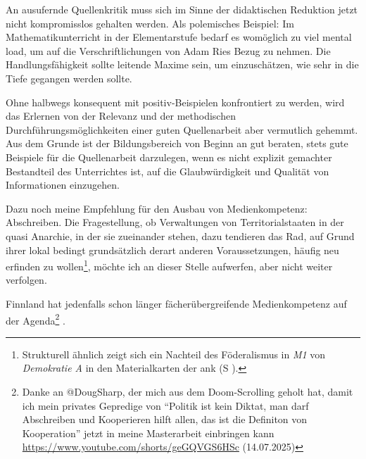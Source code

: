 An ausufernde Quellenkritik muss sich im Sinne der didaktischen Reduktion jetzt nicht kompromisslos gehalten werden.
Als polemisches Beispiel: Im Mathematikunterricht in der Elementarstufe bedarf es womöglich zu viel mental load, um auf die Verschriftlichungen von Adam Ries Bezug zu nehmen. Die Handlungsfähigkeit sollte leitende Maxime sein, um einzuschätzen, wie sehr in die Tiefe gegangen werden sollte. 

Ohne halbwegs konsequent mit positiv-Beispielen konfrontiert zu werden, wird das Erlernen von der Relevanz und der methodischen Durchführungsmöglichkeiten einer guten Quellenarbeit aber vermutlich gehemmt. Aus dem Grunde ist der Bildungsbereich von Beginn an gut beraten, stets gute Beispiele für die Quellenarbeit darzulegen, wenn es nicht explizit gemachter Bestandteil des Unterrichtes ist, auf die Glaubwürdigkeit und Qualität von Informationen einzugehen. 



\bigskip

Dazu noch meine Empfehlung für den Ausbau von Medienkompetenz: Abschreiben. Die Fragestellung, ob Verwaltungen von Territorialstaaten in der quasi Anarchie, in der sie zueinander stehen, dazu tendieren das Rad, auf Grund ihrer lokal bedingt grundsätzlich derart anderen Voraussetzungen,  häufig neu erfinden zu wollen\footnote{
    Strukturell ähnlich zeigt sich ein Nachteil des Föderalismus in \emph{M1} von \emph{Demokratie A} in den Materialkarten der \gls{ank} (\gls{S} \pageref{DEMOKRATIE-A3}).}, 
möchte ich an dieser Stelle aufwerfen, aber nicht weiter verfolgen. 

\noindent Finnland hat jedenfalls schon länger fächerübergreifende Medienkompetenz auf der Agenda\footnote{
    Danke an @DougSharp, der mich aus dem Doom-Scrolling geholt hat, damit ich mein privates Gepredige von \enquote{Politik ist kein Diktat, man darf Abschreiben und Kooperieren hilft allen, das ist die Definiton von Kooperation} jetzt in meine Masterarbeit einbringen kann \url{https://www.youtube.com/shorts/geGQVGS6HSc} (14.07.2025)
} \autocites(\gls{vgl} überblicksweise \gls{zb})(){Palsa.2015}{Salomaa.2019}. 


